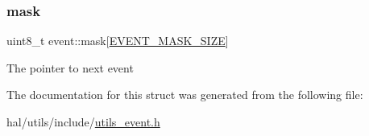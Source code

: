 \subsubsection{\texorpdfstring{mask}{mask}}
{\footnotesize\ttfamily uint8\+\_\+t event\+::mask\mbox{[}\hyperlink{utils__event_8h_a2af2644ca6887944b1e80857a8353170}{E\+V\+E\+N\+T\+\_\+\+M\+A\+S\+K\+\_\+\+S\+I\+ZE}\mbox{]}}

The pointer to next event 

The documentation for this struct was generated from the following file\+:\begin{DoxyCompactItemize}
\item 
hal/utils/include/\hyperlink{utils__event_8h}{utils\+\_\+event.\+h}\end{DoxyCompactItemize}
